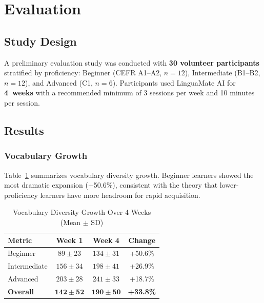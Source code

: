 \documentclass[conference]{IEEEtran}
\begin{document}
\section{Evaluation}

\subsection{Study Design}

A preliminary evaluation study was conducted with \textbf{30 volunteer participants} stratified by proficiency: Beginner (CEFR A1--A2, $n{=}12$), Intermediate (B1--B2, $n{=}12$), and Advanced (C1, $n{=}6$). Participants used LinguaMate AI for \textbf{4~weeks} with a recommended minimum of 3 sessions per week and 10 minutes per session.

\subsection{Results}

\subsubsection{Vocabulary Growth}
Table~\ref{tab:vocab} summarizes vocabulary diversity growth. Beginner learners showed the most dramatic expansion (+50.6\%), consistent with the theory that lower-proficiency learners have more headroom for rapid acquisition.

\begin{table}[htbp]
\caption{Vocabulary Diversity Growth Over 4 Weeks (Mean $\pm$ SD)}
\label{tab:vocab}
\centering
\begin{tabular}{@{}lccc@{}}
\toprule
\textbf{Metric} & \textbf{Week 1} & \textbf{Week 4} & \textbf{Change} \\
\midrule
Beginner & $89 \pm 23$ & $134 \pm 31$ & +50.6\% \\
Intermediate & $156 \pm 34$ & $198 \pm 41$ & +26.9\% \\
Advanced & $203 \pm 28$ & $241 \pm 33$ & +18.7\% \\
\textbf{Overall} & $\mathbf{142 \pm 52}$ & $\mathbf{190 \pm 50}$ & \textbf{+33.8\%} \\
\bottomrule
\end{tabular}
\end{table}
\end{document}
